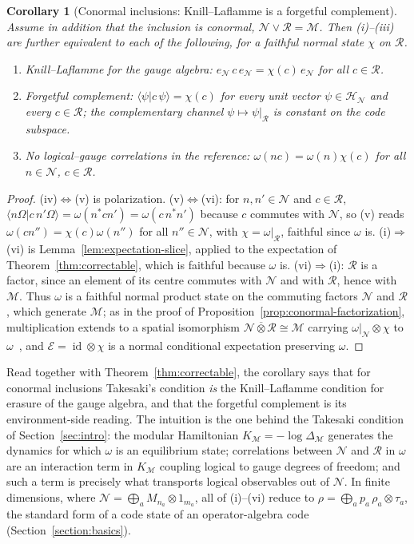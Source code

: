 \documentclass[a4paper,11pt]{article}
\newtheorem{corollary}[theorem]{Corollary}
\theoremstyle{definition}
\newcommand{\mR}{\mathcal{R}}
\newcommand{\mN}{\mathcal{N}}
\newcommand{\mH}{\mathcal{H}}
\newcommand{\mM}{\mathcal{M}}
\newcommand{\mE}{\mathcal{E}}
\begin{document}
\begin{corollary}[Conormal inclusions: Knill--Laflamme is a forgetful complement]\label{cor:KL-conormal}
Assume in addition that the inclusion is conormal, $\mN\vee\mR=\mM$. Then {\rm(i)--(iii)} are further equivalent to each of the following, for a faithful normal state $\chi$ on $\mR$.
\begin{enumerate}
 \item[\rm(iv)] \emph{Knill--Laflamme for the gauge algebra:} $e_{\mN}\,c\,e_{\mN}=\chi(c)\,e_{\mN}$ for all $c\in\mR$.
 \item[\rm(v)] \emph{Forgetful complement:} $\langle\psi|c\,\psi\rangle=\chi(c)$ for every unit vector $\psi\in\mH_{\mN}$ and every $c\in\mR$; the complementary channel $\psi\mapsto\psi|_{\mR}$ is constant on the code subspace.
 \item[\rm(vi)] \emph{No logical--gauge correlations in the reference:} $\omega(nc)=\omega(n)\chi(c)$ for all $n\in\mN$, $c\in\mR$.
\end{enumerate}
\end{corollary}

\begin{proof}
(iv)$\Leftrightarrow$(v) is polarization. (v)$\Leftrightarrow$(vi): for $n,n'\in\mN$ and $c\in\mR$, $\langle n\Omega|c\,n'\Omega\rangle=\omega(n^*cn')=\omega(c\,n^*n')$ because $c$ commutes with $\mN$, so (v) reads $\omega(cn'')=\chi(c)\omega(n'')$ for all $n''\in\mN$, with $\chi=\omega|_{\mR}$, faithful since $\omega$ is. (i)$\Rightarrow$(vi) is Lemma~\ref{lem:expectation-slice}, applied to the expectation of Theorem~\ref{thm:correctable}, which is faithful because $\omega$ is. (vi)$\Rightarrow$(i): $\mR$ is a factor, since an element of its centre commutes with $\mN$ and with $\mR$, hence with $\mM$. Thus $\omega$ is a faithful normal product state on the commuting factors $\mN$ and $\mR$, which generate $\mM$; as in the proof of Proposition~\ref{prop:conormal-factorization}, multiplication extends to a spatial isomorphism $\mN\overline\otimes\mR\cong\mM$ carrying $\omega|_{\mN}\otimes\chi$ to $\omega$~\cite{DoplicherLongo1984}, and $\mE=\operatorname{id}\otimes\chi$ is a normal conditional expectation preserving $\omega$.
\end{proof}

Read together with Theorem~\ref{thm:correctable}, the corollary says that for conormal inclusions Takesaki's condition \emph{is} the Knill--Laflamme condition for erasure of the gauge algebra, and that the forgetful complement is its environment-side reading. The intuition is the one behind the Takesaki condition of Section~\ref{sec:intro}: the modular Hamiltonian $K_{\mM}=-\log\Delta_{\mM}$ generates the dynamics for which $\omega$ is an equilibrium state; correlations between $\mN$ and $\mR$ in $\omega$ are an interaction term in $K_{\mM}$ coupling logical to gauge degrees of freedom; and such a term is precisely what transports logical observables out of $\mN$. In finite dimensions, where $\mN=\bigoplus_aM_{n_a}\otimes1_{m_a}$, all of (i)--(vi) reduce to $\rho=\bigoplus_ap_a\,\rho_a\otimes\tau_a$, the standard form of a code state of an operator-algebra code (Section~\ref{section:basics}).
\end{document}
